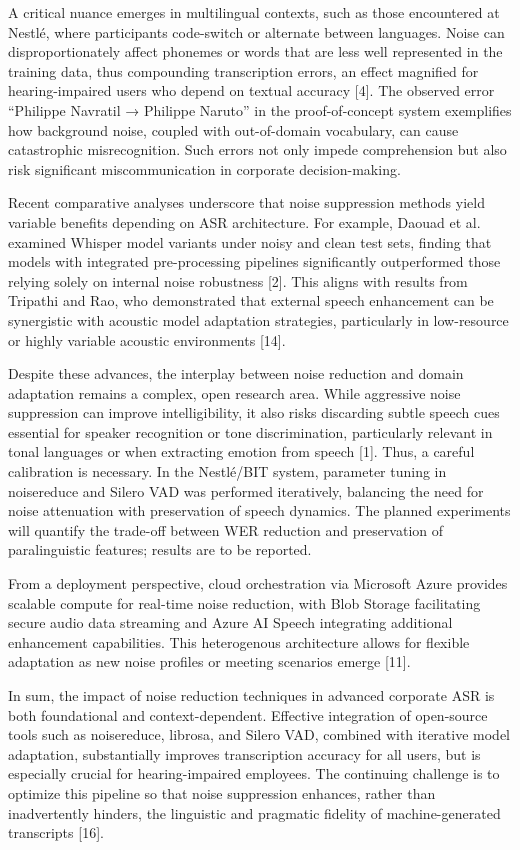 \documentclass[12pt,a4paper]{article}
\begin{document}
A critical nuance emerges in multilingual contexts, such as those encountered at Nestlé, where participants code-switch or alternate between languages. Noise can disproportionately affect phonemes or words that are less well represented in the training data, thus compounding transcription errors, an effect magnified for hearing-impaired users who depend on textual accuracy [4]. The observed error “Philippe Navratil → Philippe Naruto” in the proof-of-concept system exemplifies how background noise, coupled with out-of-domain vocabulary, can cause catastrophic misrecognition. Such errors not only impede comprehension but also risk significant miscommunication in corporate decision-making.


Recent comparative analyses underscore that noise suppression methods yield variable benefits depending on ASR architecture. For example, Daouad et al. examined Whisper model variants under noisy and clean test sets, finding that models with integrated pre-processing pipelines significantly outperformed those relying solely on internal noise robustness [2]. This aligns with results from Tripathi and Rao, who demonstrated that external speech enhancement can be synergistic with acoustic model adaptation strategies, particularly in low-resource or highly variable acoustic environments [14].


Despite these advances, the interplay between noise reduction and domain adaptation remains a complex, open research area. While aggressive noise suppression can improve intelligibility, it also risks discarding subtle speech cues essential for speaker recognition or tone discrimination, particularly relevant in tonal languages or when extracting emotion from speech [1]. Thus, a careful calibration is necessary. In the Nestlé/BIT system, parameter tuning in noisereduce and Silero VAD was performed iteratively, balancing the need for noise attenuation with preservation of speech dynamics. The planned experiments will quantify the trade-off between WER reduction and preservation of paralinguistic features; results are to be reported.


From a deployment perspective, cloud orchestration via Microsoft Azure provides scalable compute for real-time noise reduction, with Blob Storage facilitating secure audio data streaming and Azure AI Speech integrating additional enhancement capabilities. This heterogenous architecture allows for flexible adaptation as new noise profiles or meeting scenarios emerge [11].


In sum, the impact of noise reduction techniques in advanced corporate ASR is both foundational and context-dependent. Effective integration of open-source tools such as noisereduce, librosa, and Silero VAD, combined with iterative model adaptation, substantially improves transcription accuracy for all users, but is especially crucial for hearing-impaired employees. The continuing challenge is to optimize this pipeline so that noise suppression enhances, rather than inadvertently hinders, the linguistic and pragmatic fidelity of machine-generated transcripts [16].
\end{document}
